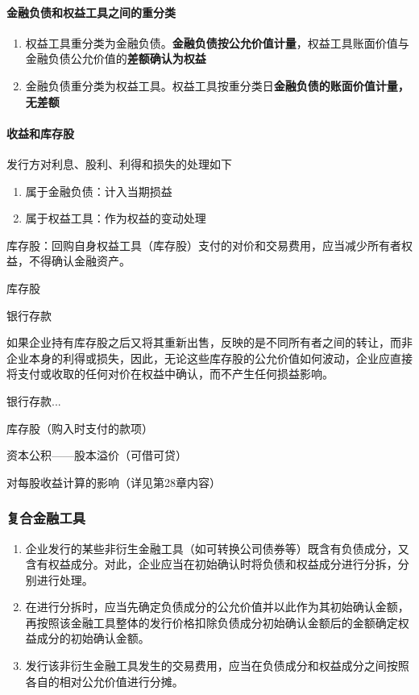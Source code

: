 \documentclass[UTF8,12pt]{ctexart}
\newenvironment{Dr}{%
	\begin{list}{}%
		{
			\setlength{\leftmargin}{2em}
			\setlength{\labelwidth}{2em}
			\setlength{\labelsep}{0pt}
			\setlength{\itemindent}{0pt}
			\setlength{\listparindent}{0pt}
			\setlength{\parsep}{0pt}
			\setlength{\topsep}{0pt}
		}
		\item[\textbf{借：}]
	}{%
	\end{list}
}
\newenvironment{Cr}{%
	\begin{list}{}%
		{
			\setlength{\leftmargin}{3em}
			\setlength{\labelwidth}{2em}
			\setlength{\labelsep}{0pt}
			\setlength{\itemindent}{0pt}
			\setlength{\listparindent}{0pt}
			\setlength{\parsep}{0pt}
			\setlength{\topsep}{0pt}
		}
		\item[\textbf{贷：}]
	}{%
	\end{list}
}
\numberwithin{equation}{section} %
\numberwithin{figure}{section}
\numberwithin{table}{section}
\begin{document}
	\paragraph{金融负债和权益工具之间的重分类}
	\begin{enumerate}
		\item 权益工具重分类为金融负债。\textbf{金融负债按公允价值计量}，权益工具账面价值与金融负债公允价值的\textbf{差额确认为权益} 
		
		\item 金融负债重分类为权益工具。权益工具按重分类日\textbf{金融负债的账面价值计量，无差额}
	\end{enumerate}
	
	\paragraph{收益和库存股}
	发行方对利息、股利、利得和损失的处理如下
	\begin{enumerate}
		\item 属于金融负债：计入当期损益
		
		\item 属于权益工具：作为权益的变动处理
	\end{enumerate}

	库存股：回购自身权益工具（库存股）支付的对价和交易费用，应当减少所有者权益，不得确认金融资产。
	
	\begin{Dr}
		库存股
	\end{Dr}
	\begin{Cr}
		银行存款
	\end{Cr}
	
	如果企业持有库存股之后又将其重新出售，反映的是不同所有者之间的转让，而非企业本身的利得或损失，因此，无论这些库存股的公允价值如何波动，企业应直接将支付或收取的任何对价在权益中确认，而不产生任何损益影响。
	
	\begin{Dr}
		银行存款...
	\end{Dr}
	\begin{Cr}
		库存股（购入时支付的款项）
		
		资本公积——股本溢价（可借可贷）
	\end{Cr}
	
	
	对每股收益计算的影响（详见第28章内容）
	
	\subsubsection{复合金融工具}
	\begin{enumerate}
		\item 企业发行的某些非衍生金融工具（如可转换公司债券等）既含有负债成分，又含有权益成分。对此，企业应当在初始确认时将负债和权益成分进行分拆，分别进行处理。
		
		\item 在进行分拆时，应当先确定负债成分的公允价值并以此作为其初始确认金额，再按照该金融工具整体的发行价格扣除负债成分初始确认金额后的金额确定权益成分的初始确认金额。
		
		\item 发行该非衍生金融工具发生的交易费用，应当在负债成分和权益成分之间按照各自的相对公允价值进行分摊。
	\end{enumerate}
	
\end{document}
